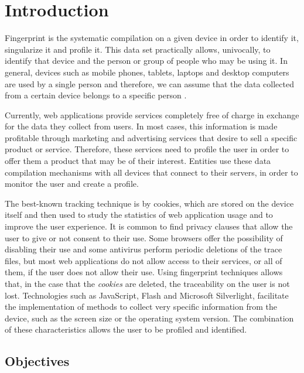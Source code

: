 \chapter{Introduction}
\label{ch:introduction}
Fingerprint is the systematic compilation on a given device in order to identify it, singularize it and profile it. This data set practically allows, univocally, to identify that device and the person or group of people who may be using it. In general, devices such as mobile phones, tablets, laptops and desktop computers are used by a single person and therefore, we can assume that the data collected from a certain device belongs to a specific person \cite{aepd}. \par

Currently, web applications provide services completely free of charge in exchange for the data they collect from users. In most cases, this information is made profitable through marketing and advertising services that desire to sell a specific product or service. Therefore, these services need to profile the user in order to offer them a product that may be of their interest. Entities use these data compilation mechanisms with all devices that connect to their servers, in order to monitor the user and create a profile. \par

The best-known tracking technique is by cookies, which are stored on the device itself and then used to study the statistics of web application usage and to improve the user experience. It is common to find privacy clauses that allow the user to give or not consent to their use. Some browsers offer the possibility of disabling their use and some antivirus perform periodic deletions of the trace files, but most web applications do not allow access to their services, or all of them, if the user does not allow their use. Using fingerprint techniques allows that, in the case that the \textit{cookies} are deleted, the traceability on the user is not lost. Technologies such as JavaScript, Flash and Microsoft Silverlight, facilitate the implementation of methods to collect very specific information from the device, such as the screen size or the operating system version. The combination of these characteristics allows the user to be profiled and identified. \par

\section{Objectives}


